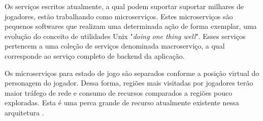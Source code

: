 Os serviços escritos atualmente, a qual podem suportar suportar milhares de jogadores, estão trabalhando como microserviços\cite{stephenclarkewillson2017}\cite{albion_online_unite}. Estes microserviços são pequenos softwares que realizam uma determinada ação de forma exemplar, uma evolução do conceito de utilidades Unix "\textit{doing one thing well}". Esses serviços pertencem a uma coleção de serviços denominada macroserviço, a qual corresponde ao serviço completo de backend da aplicação.

Os microserviços para estado de jogo são separados conforme a posição virtual do personagem do jogador. Dessa forma, regiões mais visitadas por jogadores terão maior tráfego de rede e consumo de recursos comparados a regiões pouco exploradas. Esta é uma perca grande de recurso atualmente existente nessa arquitetura \cite{cloud_fog}.
